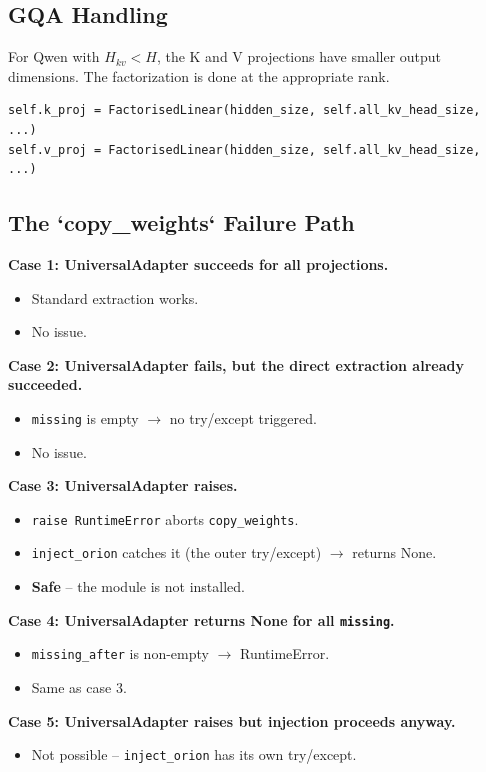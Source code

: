 \subsection{GQA Handling}

For Qwen with $H_{kv} < H$, the K and V projections have smaller output 
dimensions. The factorization is done at the appropriate rank.

\begin{lstlisting}
self.k_proj = FactorisedLinear(hidden_size, self.all_kv_head_size, ...)
self.v_proj = FactorisedLinear(hidden_size, self.all_kv_head_size, ...)
\end{lstlisting}

\subsection{The `copy\_weights` Failure Path}

\textbf{Case 1: UniversalAdapter succeeds for all projections.}
\begin{itemize}
\item Standard extraction works.
\item No issue.

\end{itemize}
\textbf{Case 2: UniversalAdapter fails, but the direct extraction already succeeded.}
\begin{itemize}
\item \texttt{missing} is empty $\to$ no try/except triggered.
\item No issue.

\end{itemize}
\textbf{Case 3: UniversalAdapter raises.}
\begin{itemize}
\item \texttt{raise RuntimeError} aborts \texttt{copy\_weights}.
\item \texttt{inject\_orion} catches it (the outer try/except) $\to$ returns None.
\item \textbf{Safe} -- the module is not installed.

\end{itemize}
\textbf{Case 4: UniversalAdapter returns None for all \texttt{missing}.}
\begin{itemize}
\item \texttt{missing\_after} is non-empty $\to$ RuntimeError.
\item Same as case 3.

\end{itemize}
\textbf{Case 5: UniversalAdapter raises but injection proceeds anyway.}
\begin{itemize}
\item Not possible -- \texttt{inject\_orion} has its own try/except.

\end{itemize}
